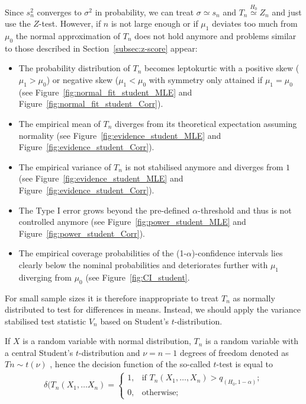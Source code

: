 Since $s_n^2$ converges to $\sigma^2$ in probability, we can treat $\sigma \simeq s_n$ and $T_n \overset{H_0}{\simeq} Z_n$ and just use the $Z$-test. However, if $n$ is not large enough or if $\mu_1$ deviates too much from $\mu_0$ the normal approximation of $T_n$ does not hold anymore and problems similar to those described in Section~\ref{subsec:z-score} appear: 
\begin{itemize}
    \item The probability distribution of $T_n$ becomes leptokurtic with a positive skew (${\mu_1 > \mu_0}$) or negative skew (${\mu_1 < \mu_0}$ with symmetry only attained if ${\mu_1 = \mu_0}$ (see Figure~\ref{fig:normal_fit_student_MLE} and Figure~\ref{fig:normal_fit_student_Corr}).
    \item The empirical mean of $T_n$ diverges from its theoretical expectation assuming normality (see Figure~\ref{fig:evidence_student_MLE} and Figure~\ref{fig:evidence_student_Corr}).
    \item The empirical variance of $T_n$ is not stabilised anymore and diverges from $1$ (see Figure~\ref{fig:evidence_student_MLE} and Figure~\ref{fig:evidence_student_Corr}).
    \item The Type I error grows beyond the pre-defined $\alpha$-threshold and thus is not controlled anymore (see Figure~\ref{fig:power_student_MLE} and Figure~\ref{fig:power_student_Corr}).
    \item The empirical coverage probabilities of the (1-$\alpha$)-confidence intervals lies clearly below the nominal probabilities and deteriorates further with $\mu_1$ diverging from $\mu_0$ (see Figure~\ref{fig:CI_student}. 
\end{itemize}
For small sample sizes it is therefore inappropriate to treat $T_n$ as normally distributed to test for differences in means. Instead, we should apply the variance stabilised test statistic $V_n$ based on Student's $t$-distribution.\par 
If $X$ is a random variable with normal distribution, $T_n$ is a random variable with a central Student's $t$-distribution and ${\nu = n-1}$ degrees of freedom denoted as $Tn \sim t(\nu)$ \citep{student_probable_1908}, hence the decision function of the so-called $t$-test is equal to
\begin{align*}
    \delta(T_n(X_1,\dots X_n) = \begin{cases} 1, & \text{if } T_n(X_1,\dots, X_n) > q_{(H_0,1-\alpha)}; \\ 0, & \mbox{otherwise;}\end{cases}
\end{align*}
